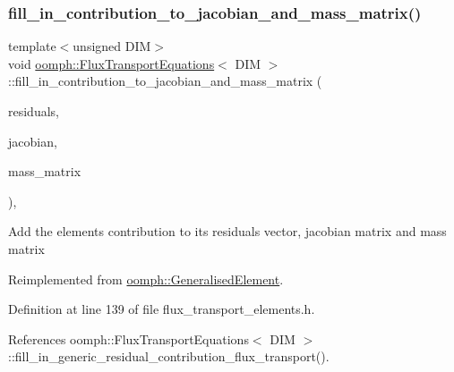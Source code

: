 \subsubsection{\texorpdfstring{fill\+\_\+in\+\_\+contribution\+\_\+to\+\_\+jacobian\+\_\+and\+\_\+mass\+\_\+matrix()}{fill\_in\_contribution\_to\_jacobian\_and\_mass\_matrix()}}
{\footnotesize\ttfamily template$<$unsigned D\+IM$>$ \\
void \hyperlink{classoomph_1_1FluxTransportEquations}{oomph\+::\+Flux\+Transport\+Equations}$<$ D\+IM $>$\+::fill\+\_\+in\+\_\+contribution\+\_\+to\+\_\+jacobian\+\_\+and\+\_\+mass\+\_\+matrix (\begin{DoxyParamCaption}\item[{\hyperlink{classoomph_1_1Vector}{Vector}$<$ double $>$ \&}]{residuals,  }\item[{\hyperlink{classoomph_1_1DenseMatrix}{Dense\+Matrix}$<$ double $>$ \&}]{jacobian,  }\item[{\hyperlink{classoomph_1_1DenseMatrix}{Dense\+Matrix}$<$ double $>$ \&}]{mass\+\_\+matrix }\end{DoxyParamCaption})\hspace{0.3cm}{\ttfamily [inline]}, {\ttfamily [virtual]}}

Add the element\textquotesingle{}s contribution to its residuals vector, jacobian matrix and mass matrix 

Reimplemented from \hyperlink{classoomph_1_1GeneralisedElement_a2b6294a730647cf865da94f2531466f8}{oomph\+::\+Generalised\+Element}.



Definition at line 139 of file flux\+\_\+transport\+\_\+elements.\+h.



References oomph\+::\+Flux\+Transport\+Equations$<$ D\+I\+M $>$\+::fill\+\_\+in\+\_\+generic\+\_\+residual\+\_\+contribution\+\_\+flux\+\_\+transport().

\mbox{\label{classoomph_1_1FluxTransportEquations_a12c2f66dbf817754f548cb51137529fa}} 
